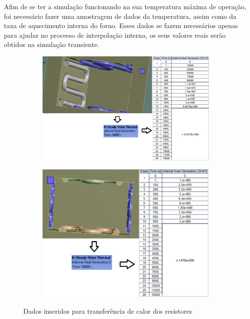 Afim de se ter a simulação funcionando na sua temperatura máxima de operação, foi
necessário fazer uma amostragem de dados da temperatura, assim como da taxa de aquecimento
interna do forno. Esses dados se fazem necessários apenas para ajudar no processo de interpolação
interna, os seus valores reais serão obtidos na simulação transiente.
\begin{figure}[ht]
\centering
    \begin{subfigure}{0.49\linewidth} \centering
        \includegraphics[scale=0.5]{figuras/ansys2.jpg}
        \label{ansys2}
    \end{subfigure}
    \begin{subfigure}{0.49\linewidth} \centering
        \includegraphics[scale=0.5]{figuras/ansys3.jpg}
        \label{ansys3}
    \end{subfigure}
    \caption{Dados inseridos para transferência de calor dos resistores}
\end{figure}


